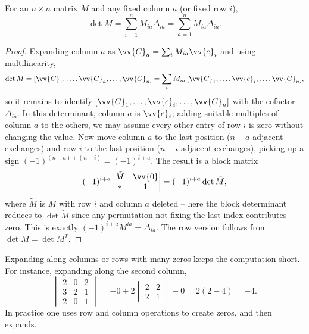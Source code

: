 \begin{theorem}
	For an $n \times n$ matrix $M$ and any fixed column $a$ (or fixed row $i$),
	$$
	\det M = \sum_{i = 1}^n M_{ia}\Delta_{ia} = \sum_{a = 1}^n M_{ia}\Delta_{ia}.
	$$
\end{theorem}
\begin{proof}
	Expanding column $a$ as $\vv{C}_a = \sum_i M_{ia}\vv{e}_i$ and using multilinearity,
	$$
	\det M = [\vv{C}_1, \dots, \vv{C}_a, \dots, \vv{C}_n] = \sum_i M_{ia}\, [\vv{C}_1, \dots, \vv{e}_i, \dots, \vv{C}_n],
	$$
	so it remains to identify $[\vv{C}_1, \dots, \vv{e}_i, \dots, \vv{C}_n]$ with the cofactor $\Delta_{ia}$. In this determinant, column $a$ is $\vv{e}_i$; adding suitable multiples of column $a$ to the others, we may assume every other entry of row $i$ is zero without changing the value. Now move column $a$ to the last position ($n - a$ adjacent exchanges) and row $i$ to the last position ($n - i$ adjacent exchanges), picking up a sign $(-1)^{(n-a) + (n - i)} = (-1)^{i + a}$. The result is a block matrix
	$$
	(-1)^{i+a}\begin{vmatrix}
		\tilde{M} & \vv{0} \\
		* & 1
	\end{vmatrix} = (-1)^{i + a}\det \tilde{M},
	$$
	where $\tilde{M}$ is $M$ with row $i$ and column $a$ deleted -- here the block determinant reduces to $\det \tilde M$ since any permutation not fixing the last index contributes zero. This is exactly $(-1)^{i+a}M^{ia} = \Delta_{ia}$. The row version follows from $\det M = \det M^T$.
\end{proof}

\begin{example}
	Expanding along columns or rows with many zeros keeps the computation short. For instance, expanding along the second column,
	$$
	\begin{vmatrix}
		2 & 0 & 2 \\
		3 & 2 & 1 \\
		2 & 0 & 1
	\end{vmatrix}
	= - 0 + 2\begin{vmatrix} 2 & 2 \\ 2 & 1\end{vmatrix} - 0 = 2(2 - 4) = -4.
	$$
	In practice one uses row and column operations to create zeros, and then expands.
\end{example}

